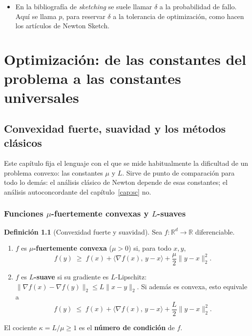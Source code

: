 \documentclass[11pt,a4paper,oneside]{book}
\theoremstyle{definition}
\newtheorem{definicion}[teorema]{Definición}
\theoremstyle{remark}
\newcommand{\R}{\mathbb{R}}
\newcommand{\nrm}[1]{\lVert #1\rVert}
\newcommand{\ip}[2]{\langle #1,\, #2\rangle}
\begin{document}
\begin{cuidado}
\begin{itemize}
  \item En la bibliografía de \emph{sketching} se suele llamar $\delta$ a la probabilidad de fallo. Aquí se
        llama $p$, para reservar $\delta$ a la tolerancia de optimización, como hacen los artículos de Newton Sketch.
\end{itemize}
\end{cuidado}
\part{Optimización: de las constantes del problema a las constantes universales}
\chapter{Convexidad fuerte, suavidad y los métodos clásicos}\label{cap:opt}

Este capítulo fija el lenguaje con el que se mide habitualmente la dificultad de un problema convexo: las
constantes $\mu$ y $L$. Sirve de punto de comparación para todo lo demás: el análisis clásico de Newton
depende de esas constantes; el análisis autoconcordante del capítulo~\ref{cap:sc} no.

\section{Funciones \texorpdfstring{$\mu$}{mu}-fuertemente convexas y \texorpdfstring{$L$}{L}-suaves}

\begin{definicion}[Convexidad fuerte y suavidad]\label{def:mu-L}
Sea $f:\R^d\to\R$ diferenciable.
\begin{enumerate}[label=(\alph*)]
  \item $f$ es \textbf{$\mu$-fuertemente convexa} ($\mu>0$) si, para todo $x,y$,
  \[ f(y)\;\ge\; f(x)+\ip{\nabla f(x)}{y-x}+\frac{\mu}{2}\nrm{y-x}_2^2 . \]
  \item $f$ es \textbf{$L$-suave} si su gradiente es $L$-Lipschitz: $\nrm{\nabla f(x)-\nabla f(y)}_2\le L\nrm{x-y}_2$.
        Si además es convexa, esto equivale a
  \[ f(y)\;\le\; f(x)+\ip{\nabla f(x)}{y-x}+\frac{L}{2}\nrm{y-x}_2^2 . \]
\end{enumerate}
El cociente $\kappa=L/\mu\ge 1$ es el \textbf{número de condición} de $f$.
\end{definicion}
\end{document}
